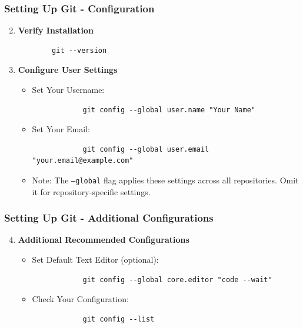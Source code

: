 \documentclass{beamer}
\begin{document}
\begin{frame}[fragile]
    \frametitle{Setting Up Git - Configuration}
    \begin{enumerate}
        \setcounter{enumi}{1}
        \item \textbf{Verify Installation}
        \begin{lstlisting}
        git --version
        \end{lstlisting}
        
        \item \textbf{Configure User Settings}
        \begin{itemize}
            \item Set Your Username:
            \begin{lstlisting}
            git config --global user.name "Your Name"
            \end{lstlisting}
            \item Set Your Email:
            \begin{lstlisting}
            git config --global user.email "your.email@example.com"
            \end{lstlisting}
            \item Note: The \texttt{--global} flag applies these settings across all repositories. Omit it for repository-specific settings.
        \end{itemize}
    \end{enumerate}
\end{frame}

\begin{frame}[fragile]
    \frametitle{Setting Up Git - Additional Configurations}
    \begin{enumerate}
        \setcounter{enumi}{3}
        \item \textbf{Additional Recommended Configurations}
        \begin{itemize}
            \item Set Default Text Editor (optional):
            \begin{lstlisting}
            git config --global core.editor "code --wait"
            \end{lstlisting}
            \item Check Your Configuration:
            \begin{lstlisting}
            git config --list
            \end{lstlisting}
        \end{itemize}
    \end{enumerate}
\end{frame}
\end{document}

